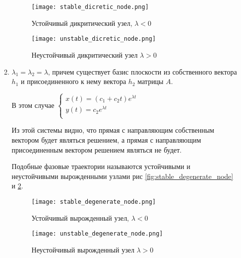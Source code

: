 \begin{enumerate}
\begin{enumerate}
    \begin{figure}[h!]
      \begin{center}
          \begin{minipage}[h!]{0.48\linewidth}
              \texttt{[image: stable\_dicretic\_node.png]}
              \caption{Устойчивый дикритический узел, $\lambda < 0$}
              \label{fig:stable_dicretic_node}
          \end{minipage}
          \hfill
          \begin{minipage}[h!]{0.48\linewidth}
              \texttt{[image: unstable\_dicretic\_node.png]}
              \caption{Неустойчивый дикритический узел $\lambda > 0$}
              \label{fig:unstable_dicretic_node}
          \end{minipage}
      \end{center}
    \end{figure}

    \item $\lambda_1 = \lambda_2 = \lambda$, причем существует базис плоскости из собственного вектора $h_1$ и присоединенного к нему вектора $h_2$ матрицы $A$.
    
    В этом случае
    $\begin{cases}
      x(t) = (c_1 + c_2 t) e^{\lambda t} \\
      y(t) = c_2 e^{\lambda t} \\
    \end{cases}$

    Из этой системы видно, что прямая с направляющим собственным вектором будет являться решением, а прямая с направляющим присоединенным вектором решением являться не будет.
    
    Подобные фазовые траектории называются устойчивыми и неустойчивыми вырожденными узлами рис \ref{fig:stable_degenerate_node} и \ref{fig:unstable_degenerate_node}.

    \begin{figure}[h!]
      \begin{center}
          \begin{minipage}[h!]{0.48\linewidth}
              \texttt{[image: stable\_degenerate\_node.png]}
              \caption{Устойчивый вырожденный узел, $\lambda < 0$}
              \label{fig:stable_degenerate_node}
          \end{minipage}
          \hfill
          \begin{minipage}[h!]{0.48\linewidth}
              \texttt{[image: unstable\_degenerate\_node.png]}
              \caption{Неустойчивый вырожденный узел $\lambda > 0$}
              \label{fig:unstable_degenerate_node}
          \end{minipage}
      \end{center}
    \end{figure}


\end{enumerate}
\end{enumerate}
